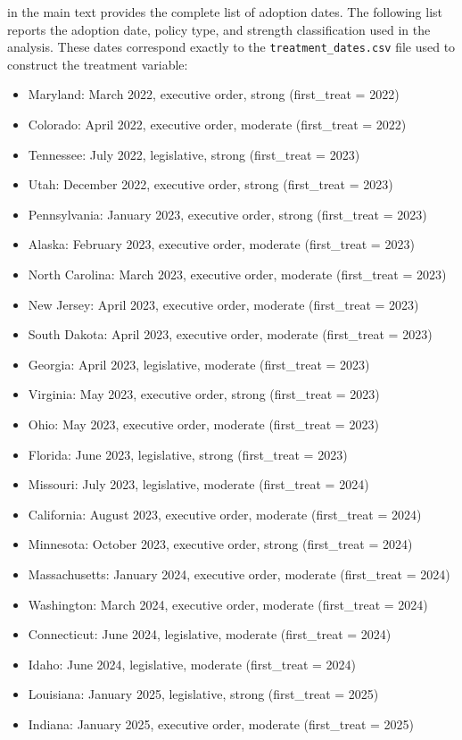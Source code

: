 \documentclass[12pt]{article}
\begin{document}
 in the main text provides the complete list of adoption dates. The following list reports the adoption date, policy type, and strength classification used in the analysis. These dates correspond exactly to the \texttt{treatment\_dates.csv} file used to construct the treatment variable:
\begin{itemize}
\item Maryland: March 2022, executive order, strong (first\_treat = 2022)
\item Colorado: April 2022, executive order, moderate (first\_treat = 2022)
\item Tennessee: July 2022, legislative, strong (first\_treat = 2023)
\item Utah: December 2022, executive order, strong (first\_treat = 2023)
\item Pennsylvania: January 2023, executive order, strong (first\_treat = 2023)
\item Alaska: February 2023, executive order, moderate (first\_treat = 2023)
\item North Carolina: March 2023, executive order, moderate (first\_treat = 2023)
\item New Jersey: April 2023, executive order, moderate (first\_treat = 2023)
\item South Dakota: April 2023, executive order, moderate (first\_treat = 2023)
\item Georgia: April 2023, legislative, moderate (first\_treat = 2023)
\item Virginia: May 2023, executive order, strong (first\_treat = 2023)
\item Ohio: May 2023, executive order, moderate (first\_treat = 2023)
\item Florida: June 2023, legislative, strong (first\_treat = 2023)
\item Missouri: July 2023, legislative, moderate (first\_treat = 2024)
\item California: August 2023, executive order, moderate (first\_treat = 2024)
\item Minnesota: October 2023, executive order, strong (first\_treat = 2024)
\item Massachusetts: January 2024, executive order, moderate (first\_treat = 2024)
\item Washington: March 2024, executive order, moderate (first\_treat = 2024)
\item Connecticut: June 2024, legislative, moderate (first\_treat = 2024)
\item Idaho: June 2024, legislative, moderate (first\_treat = 2024)
\item Louisiana: January 2025, legislative, strong (first\_treat = 2025)
\item Indiana: January 2025, executive order, moderate (first\_treat = 2025)
\end{itemize}
\end{document}
